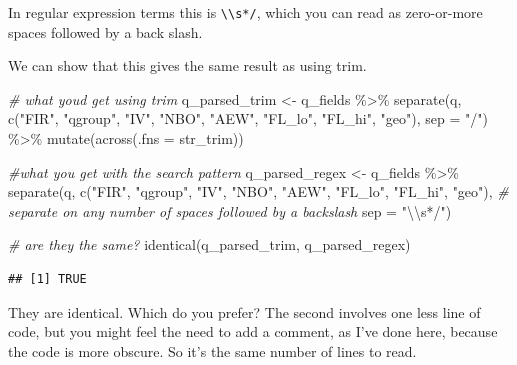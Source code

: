 \documentclass[
]{book}
\newenvironment{Shaded}{\begin{snugshade}}{\end{snugshade}}
\newcommand{\AttributeTok}[1]{\textcolor[rgb]{0.77,0.63,0.00}{#1}}
\newcommand{\CommentTok}[1]{\textcolor[rgb]{0.56,0.35,0.01}{\textit{#1}}}
\newcommand{\FunctionTok}[1]{\textcolor[rgb]{0.00,0.00,0.00}{#1}}
\newcommand{\NormalTok}[1]{#1}
\newcommand{\OtherTok}[1]{\textcolor[rgb]{0.56,0.35,0.01}{#1}}
\newcommand{\SpecialCharTok}[1]{\textcolor[rgb]{0.00,0.00,0.00}{#1}}
\newcommand{\StringTok}[1]{\textcolor[rgb]{0.31,0.60,0.02}{#1}}
\begin{document}
In regular expression terms this is \texttt{\textbackslash{}\textbackslash{}s*/}, which you can read as zero-or-more spaces followed by a back slash.

We can show that this gives the same result as using trim.

\begin{Shaded}
\begin{Highlighting}[]
\CommentTok{\# what you\textquotesingle{}d get using trim}
\NormalTok{q\_parsed\_trim }\OtherTok{\textless{}{-}}\NormalTok{ q\_fields }\SpecialCharTok{\%\textgreater{}\%} 
  \FunctionTok{separate}\NormalTok{(q,}
            \FunctionTok{c}\NormalTok{(}\StringTok{"FIR"}\NormalTok{, }\StringTok{"qgroup"}\NormalTok{, }\StringTok{"IV"}\NormalTok{, }\StringTok{"NBO"}\NormalTok{, }\StringTok{"AEW"}\NormalTok{, }\StringTok{"FL\_lo"}\NormalTok{, }\StringTok{"FL\_hi"}\NormalTok{, }\StringTok{"geo"}\NormalTok{),}
            \AttributeTok{sep =} \StringTok{"/"}\NormalTok{) }\SpecialCharTok{\%\textgreater{}\%} 
  \FunctionTok{mutate}\NormalTok{(}\FunctionTok{across}\NormalTok{(}\AttributeTok{.fns =}\NormalTok{ str\_trim))}

\CommentTok{\#what you get with the search pattern}
\NormalTok{q\_parsed\_regex }\OtherTok{\textless{}{-}}\NormalTok{ q\_fields }\SpecialCharTok{\%\textgreater{}\%} 
  \FunctionTok{separate}\NormalTok{(q,}
            \FunctionTok{c}\NormalTok{(}\StringTok{"FIR"}\NormalTok{, }\StringTok{"qgroup"}\NormalTok{, }\StringTok{"IV"}\NormalTok{, }\StringTok{"NBO"}\NormalTok{, }\StringTok{"AEW"}\NormalTok{, }\StringTok{"FL\_lo"}\NormalTok{, }\StringTok{"FL\_hi"}\NormalTok{, }\StringTok{"geo"}\NormalTok{),}
           \CommentTok{\# separate on any number of spaces followed by a backslash}
            \AttributeTok{sep =} \StringTok{"}\SpecialCharTok{\textbackslash{}\textbackslash{}}\StringTok{s*/"}\NormalTok{)}

\CommentTok{\# are they the same?}
\FunctionTok{identical}\NormalTok{(q\_parsed\_trim, q\_parsed\_regex)}
\end{Highlighting}
\end{Shaded}

\begin{verbatim}
## [1] TRUE
\end{verbatim}

They are identical. Which do you prefer? The second involves one less line of code, but you might feel the need to add a comment, as I've done here, because the code is more obscure. So it's the same number of lines to read.
\end{document}
